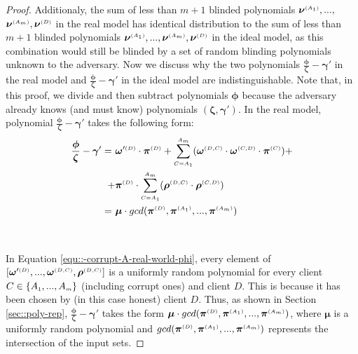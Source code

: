 \begin{proof}
Additionaly, the sum of less than $m+1$ blinded polynomials ${\bm\nu}^{\scriptscriptstyle (A_{\scriptscriptstyle 1})},...,$ ${\bm\nu}^{\scriptscriptstyle (A_{\scriptscriptstyle m})}, \bm\nu^{ \scriptscriptstyle {  {(D)}}}$   in the real model has identical distribution to the sum of less than $m+1$ blinded polynomials $ {\bm\nu}^{\scriptscriptstyle (A_{\scriptscriptstyle 1})},...,  {\bm\nu}^{\scriptscriptstyle (A_{\scriptscriptstyle m})},  {\bm\nu}^{ \scriptscriptstyle {  {(D)}}}$ in the ideal model, as this combination would still be blinded by a set of random blinding polynomials unknown to the adversary. Now we discuss why the two polynomials $\frac{\bm\phi}{\bm\zeta}- \bm\gamma'$ in the real model and $\frac{ {\bm\phi}} { {\bm\zeta}}-  {\bm\gamma'}$ in the ideal model are indistinguishable. Note that, in this proof, we divide and then subtract  polynomials ${\bm\phi}$ because the adversary already knows (and must know) polynomials $(\bm\zeta, \bm\gamma')$. In the real model, polynomial $\frac{\bm\phi}{\bm\zeta}- \bm\gamma'$ takes the following form: 
%
\begin{equation}\label{equ::-corrupt-A-real-world-phi}
%
\begin{split}
 \frac{\bm\phi}{\bm\zeta}- \bm\gamma'=\ &  \bm\omega'^{ \st {  {(D)}}}\cdot \bm\pi^{ \st {  {(D)}} } +\sum\limits^{ \st {   A}_{ \st {   m}}}_{ \st {  {C }= }  \st {   A}_{ \st {  1}}}(\bm\omega^{ \st {  {(D,C)}}} \cdot \bm\omega^{ \st {  {(C,D)}}}\cdot \bm\pi^{ \st {  (C)}})+ \\+ & \bm\pi^{ \st {  {(D)}}}\cdot\sum\limits^{ \st {   A}_{ \st {   m}}}_{ \st {  {C }= }  \st {   A}_{ \st {  1}}}(\bm\rho^{ \st {  {(D,C)}}} \cdot \bm\rho^{ \st {  {(C,D)}}})\\=\ &\bm\mu\cdot gcd( \bm\pi^{ \st {  {(D)}} },\bm\pi^{\st (A_1)}, ..., \bm\pi^{\st (A_m)})
 \end{split}
\end{equation}

\

In Equation \ref{equ::-corrupt-A-real-world-phi}, every element of   $[\bm\omega'^{ \scriptscriptstyle {  {(D)}}},..., \bm\omega^{ \scriptscriptstyle {  {(D,C)}}}, \bm\rho^{ \scriptscriptstyle {  {(D,C)}}}]$ is a uniformly random polynomial for every  client $C\in \{  {  A}_{ \scriptscriptstyle {   1}}, ...,   {  A}_{ \scriptscriptstyle {   m}}\}$  (including corrupt ones) and client $D$. This is because it has been chosen by (in this case honest) client $D$. Thus,  as shown in Section \ref{sec::poly-rep}, $\frac{\bm\phi}{\bm\zeta}- \bm\gamma'$ takes the form $\bm\mu\cdot gcd( \bm\pi^{ \scriptscriptstyle {  {(D)}} },\bm\pi^{\scriptscriptstyle (A_1)}, ..., \bm\pi^{\scriptscriptstyle (A_m)})$, where $\bm\mu$ is a uniformly random polynomial and $gcd( \bm\pi^{ \scriptscriptstyle {  {(D)}} },\bm\pi^{\scriptscriptstyle (A_1)}, ..., \bm\pi^{\scriptscriptstyle (A_m)})$ represents the intersection of the input sets. 


\end{proof}
